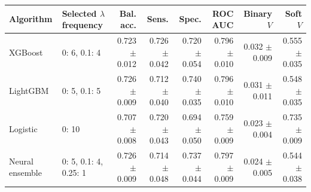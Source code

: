 \begin{tabular}{lp{2.4cm}rrrrrr}
\toprule
Algorithm & Selected $\lambda$ frequency & Bal. acc. & Sens. & Spec. & ROC AUC & Binary $V$ & Soft $V$ \\
\midrule
XGBoost & 0: 6, 0.1: 4 & 0.723 $\pm$ 0.012 & 0.726 $\pm$ 0.042 & 0.720 $\pm$ 0.054 & 0.796 $\pm$ 0.010 & 0.032 $\pm$ 0.009 & 0.555 $\pm$ 0.035 \\
LightGBM & 0: 5, 0.1: 5 & 0.726 $\pm$ 0.009 & 0.712 $\pm$ 0.040 & 0.740 $\pm$ 0.035 & 0.796 $\pm$ 0.010 & 0.031 $\pm$ 0.011 & 0.548 $\pm$ 0.035 \\
Logistic & 0: 10 & 0.707 $\pm$ 0.008 & 0.720 $\pm$ 0.043 & 0.694 $\pm$ 0.050 & 0.759 $\pm$ 0.009 & 0.023 $\pm$ 0.004 & 0.735 $\pm$ 0.009 \\
Neural ensemble & 0: 5, 0.1: 4, 0.25: 1 & 0.726 $\pm$ 0.009 & 0.714 $\pm$ 0.048 & 0.737 $\pm$ 0.044 & 0.797 $\pm$ 0.009 & 0.024 $\pm$ 0.005 & 0.544 $\pm$ 0.038 \\
\bottomrule
\end{tabular}
